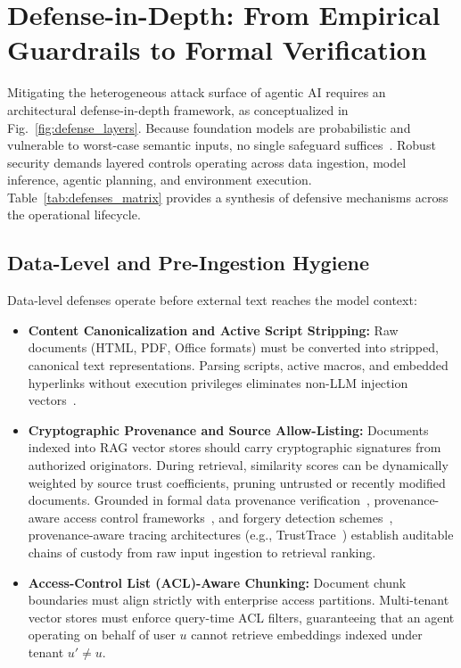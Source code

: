 \section{Defense-in-Depth: From Empirical Guardrails to Formal Verification}
\label{sec:defenses}

Mitigating the heterogeneous attack surface of agentic AI requires an architectural defense-in-depth framework, as conceptualized in Fig.~\ref{fig:defense_layers}. Because foundation models are probabilistic and vulnerable to worst-case semantic inputs, no single safeguard suffices~\cite{dehghantanha2026sok}. Robust security demands layered controls operating across data ingestion, model inference, agentic planning, and environment execution. Table~\ref{tab:defenses_matrix} provides a synthesis of defensive mechanisms across the operational lifecycle.




\subsection{Data-Level and Pre-Ingestion Hygiene}
\label{subsec:data_defenses}

Data-level defenses operate before external text reaches the model context:
\begin{itemize}
    \item \textbf{Content Canonicalization and Active Script Stripping:} Raw documents (HTML, PDF, Office formats) must be converted into stripped, canonical text representations. Parsing scripts, active macros, and embedded hyperlinks without execution privileges eliminates non-LLM injection vectors~\cite{dehghantanha2026sok}.
    \item \textbf{Cryptographic Provenance and Source Allow-Listing:} Documents indexed into RAG vector stores should carry cryptographic signatures from authorized originators. During retrieval, similarity scores can be dynamically weighted by source trust coefficients, pruning untrusted or recently modified documents. Grounded in formal data provenance verification~\cite{xu2012dataprovenance}, provenance-aware access control frameworks~\cite{sun2016a}, and forgery detection schemes~\cite{sultana2015a}, provenance-aware tracing architectures (e.g., TrustTrace~\cite{chen2026trusttrace}) establish auditable chains of custody from raw input ingestion to retrieval ranking.
    \item \textbf{Access-Control List (ACL)-Aware Chunking:} Document chunk boundaries must align strictly with enterprise access partitions. Multi-tenant vector stores must enforce query-time ACL filters, guaranteeing that an agent operating on behalf of user $u$ cannot retrieve embeddings indexed under tenant $u' \neq u$.
\end{itemize}


